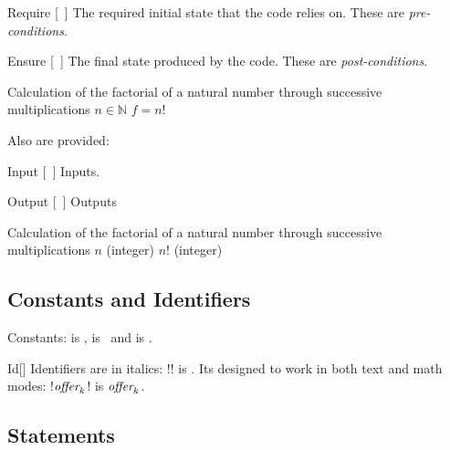 \documentclass[a4paper, 11pt]{article}
\begin{document}
\begin{macro}{Require}
    [~]
    The required initial state that the code relies on. These are \textit{pre-conditions}.
\end{macro}

\begin{macro}{Ensure}
    [~]
    The final state produced by the code. These are \textit{post-conditions}.
\end{macro}

\begin{tcblisting}{}
    \begin{algorithmic}
        \Description Calculation of the factorial of a natural number through successive multiplications
        \Require $n \in \mathbb{N}$
        \Ensure $f = n!$
    \end{algorithmic}
\end{tcblisting}

Also are provided:
\begin{macro}{Input}
    [~]
    Inputs.
\end{macro}
\begin{macro}{Output}
    [~]
    Outputs
\end{macro}

\begin{tcblisting}{}
    \begin{algorithmic}
        \Description Calculation of the factorial of a natural number through successive multiplications
        \Input $n$ (integer)
        \Output $n!$ (integer)
    \end{algorithmic}
\end{tcblisting}

\subsection{Constants and Identifiers}

Constants:  is \True,  is \False\ and  is \Nil.

\begin{macro}{Id}[]
    Identifiers are in italics: \latexinline!! is . Its designed to work in both text and math modes: \latexinline!$\textit{\rmfamily offer}_k$! is $\textit{\rmfamily offer}_k$.
\end{macro}

\subsection{Statements}
\end{document}
